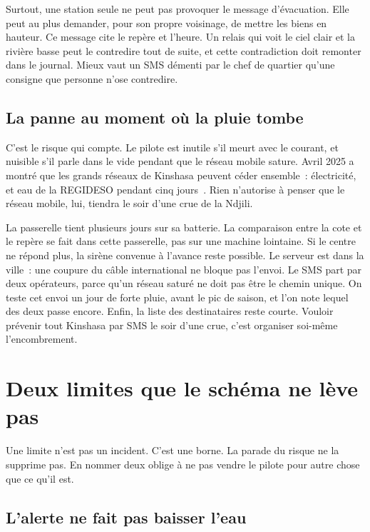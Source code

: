 \documentclass[12pt,a4paper]{article}
\begin{document}
Surtout, une station seule ne peut pas provoquer le message d'évacuation. Elle peut au plus demander, pour son propre voisinage, de mettre les biens en hauteur. Ce message cite le repère et l'heure. Un relais qui voit le ciel clair et la rivière basse peut le contredire tout de suite, et cette contradiction doit remonter dans le journal. Mieux vaut un SMS démenti par le chef de quartier qu'une consigne que personne n'ose contredire.

\subsection{La panne au moment où la pluie tombe}

C'est le risque qui compte. Le pilote est inutile s'il meurt avec le courant, et nuisible s'il parle dans le vide pendant que le réseau mobile sature. Avril 2025 a montré que les grands réseaux de Kinshasa peuvent céder ensemble~: électricité, et eau de la REGIDESO pendant cinq jours~\cite{ifrc2025}. Rien n'autorise à penser que le réseau mobile, lui, tiendra le soir d'une crue de la Ndjili.

La passerelle tient plusieurs jours sur sa batterie. La comparaison entre la cote et le repère se fait dans cette passerelle, pas sur une machine lointaine. Si le centre ne répond plus, la sirène convenue à l'avance reste possible. Le serveur est dans la ville~: une coupure du câble international ne bloque pas l'envoi. Le SMS part par deux opérateurs, parce qu'un réseau saturé ne doit pas être le chemin unique. On teste cet envoi un jour de forte pluie, avant le pic de saison, et l'on note lequel des deux passe encore. Enfin, la liste des destinataires reste courte. Vouloir prévenir tout Kinshasa par SMS le soir d'une crue, c'est organiser soi-même l'encombrement.

\section{Deux limites que le schéma ne lève pas}
\label{sec:limites}

Une limite n'est pas un incident. C'est une borne. La parade du risque ne la supprime pas. En nommer deux oblige à ne pas vendre le pilote pour autre chose que ce qu'il est.

\subsection{L'alerte ne fait pas baisser l'eau}
\end{document}
